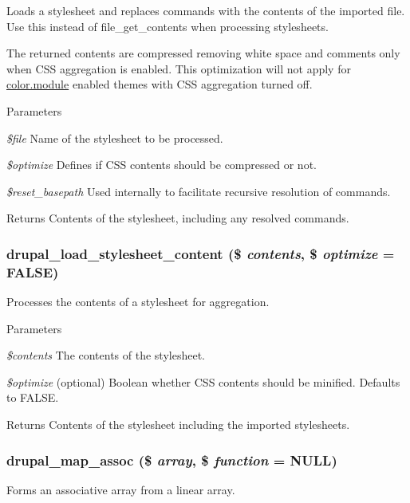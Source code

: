 Loads a stylesheet and replaces  commands with the contents of the imported file. Use this instead of file\_\-get\_\-contents when processing stylesheets.

The returned contents are compressed removing white space and comments only when CSS aggregation is enabled. This optimization will not apply for \hyperlink{color_8module}{color.module} enabled themes with CSS aggregation turned off.


\begin{DoxyParams}{Parameters}
\item[{\em \$file}]Name of the stylesheet to be processed. \item[{\em \$optimize}]Defines if CSS contents should be compressed or not. \item[{\em \$reset\_\-basepath}]Used internally to facilitate recursive resolution of  commands.\end{DoxyParams}
\begin{DoxyReturn}{Returns}
Contents of the stylesheet, including any resolved  commands. 
\end{DoxyReturn}
\hypertarget{common_8inc_a3103cf0e37656ce026267e14260d9ea6}{
\subsubsection[{drupal\_\-load\_\-stylesheet\_\-content}]{\setlength{\rightskip}{0pt plus 5cm}drupal\_\-load\_\-stylesheet\_\-content (\$ {\em contents}, \/  \$ {\em optimize} = {\ttfamily FALSE})}}
\label{common_8inc_a3103cf0e37656ce026267e14260d9ea6}
Processes the contents of a stylesheet for aggregation.


\begin{DoxyParams}{Parameters}
\item[{\em \$contents}]The contents of the stylesheet. \item[{\em \$optimize}](optional) Boolean whether CSS contents should be minified. Defaults to FALSE.\end{DoxyParams}
\begin{DoxyReturn}{Returns}
Contents of the stylesheet including the imported stylesheets. 
\end{DoxyReturn}
\hypertarget{common_8inc_a72b55fe42aa726cc506660138abd3307}{
\subsubsection[{drupal\_\-map\_\-assoc}]{\setlength{\rightskip}{0pt plus 5cm}drupal\_\-map\_\-assoc (\$ {\em array}, \/  \$ {\em function} = {\ttfamily NULL})}}
\label{common_8inc_a72b55fe42aa726cc506660138abd3307}
Forms an associative array from a linear array.

